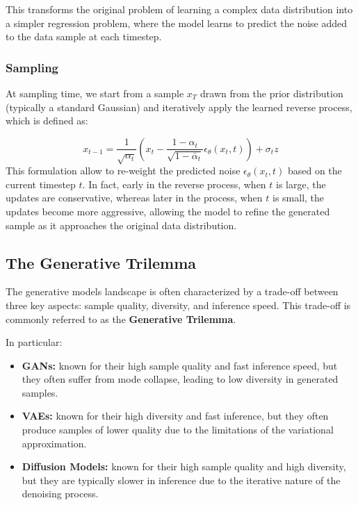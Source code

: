This transforms the original problem of learning a complex data distribution into a simpler regression problem, where the model learns to predict the noise added to the data sample at each timestep.

\subsubsection{Sampling}
At sampling time, we start from a sample \(x_T\) drawn from the prior distribution (typically a standard Gaussian) and iteratively apply the learned reverse process, which is defined as:

\begin{equation}
    x_{t-1} = \frac{1}{\sqrt{\alpha_t}} \left( x_t - \frac{1 - \alpha_t}{\sqrt{1 - \bar{\alpha}_t}} \epsilon_\theta(x_t, t) \right) + \sigma_t z
\end{equation}
This formulation allow to re-weight the predicted noise \(\epsilon_\theta(x_t, t)\) based on the current timestep \(t\).
In fact, early in the reverse process, when \(t\) is large, the updates are conservative, whereas later in the process, when \(t\) is small, the updates become more aggressive, allowing the model to refine the generated sample as it approaches the original data distribution.

\subsection{The Generative Trilemma}
The generative models landscape is often characterized by a trade-off between three key aspects: sample quality, diversity, and inference speed. 
This trade-off is commonly referred to as the \textbf{Generative Trilemma}.

In particular:
\begin{itemize}
    \item \textbf{GANs:} known for their high sample quality and fast inference speed, but they often suffer from mode collapse, leading to low diversity in generated samples.
    \item \textbf{VAEs:} known for their high diversity and fast inference, but they often produce samples of lower quality due to the limitations of the variational approximation.
    \item \textbf{Diffusion Models:} known for their high sample quality and high diversity, but they are typically slower in inference due to the iterative nature of the denoising process.
\end{itemize}

